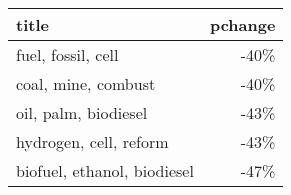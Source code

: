 \begin{tabular}{p{1.2cm}r}
\toprule
                       title &  pchange \\
\midrule
          fuel, fossil, cell &     -40\% \\
         coal, mine, combust &     -40\% \\
        oil, palm, biodiesel &     -43\% \\
      hydrogen, cell, reform &     -43\% \\
 biofuel, ethanol, biodiesel &     -47\% \\
\bottomrule
\end{tabular}
